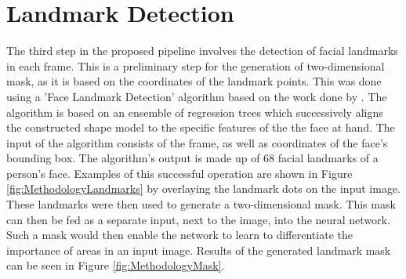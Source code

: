 \section{Landmark Detection}
The third step in the proposed pipeline involves the detection of facial landmarks in each frame. This is a preliminary step for the generation of two-dimensional mask, as it is based on the coordinates of the landmark points.
\newline\newline
This was done using a 'Face Landmark Detection' algorithm based on the work done by \citet{Kazemi:2014:ShapePredictor}. The algorithm is based on an ensemble of regression trees which successively aligns the constructed shape model to the specific features of the the face at hand.
\newline\newline
The input of the algorithm consists of the frame, as well as coordinates of the face's bounding box. The algorithm's output is made up of 68 facial landmarks of a person's face. Examples of this successful operation are shown in Figure \ref{fig:MethodologyLandmarks} by overlaying the landmark dots on the input image.
\newline\newline
These landmarks were then used to generate a two-dimensional mask. This mask can then be fed as a separate input, next to the image, into the neural network. Such a mask would then enable the network to learn to differentiate the importance of areas in an input image. Results of the generated landmark mask can be seen in Figure \ref{fig:MethodologyMask}.

